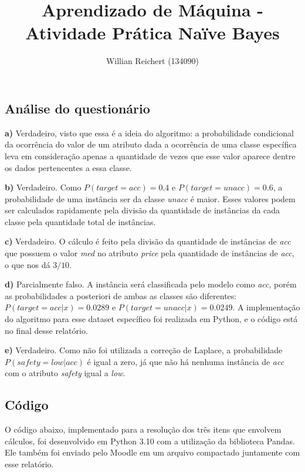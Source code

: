 \documentclass{article}
\title{Aprendizado de Máquina - Atividade Prática Naïve Bayes}
\author{Willian Reichert (134090)}
\date{}
\begin{document}
\maketitle

\subsection*{Análise do questionário}

\textbf{a)} Verdadeiro, visto que essa é a ideia do algoritmo: a probabilidade condicional da ocorrência do valor de um atributo dada a ocorrência de uma classe específica leva em consideração apenas a quantidade de vezes que esse valor aparece dentre os dados pertencentes a essa classe.

\medskip

\textbf{b)} Verdadeiro. Como \(P(target = acc) = 0.4\) e \(P(target = unacc) = 0.6\), a probabilidade de uma instância ser da classe \emph{unacc} é maior. Esses valores podem ser calculados rapidamente pela divisão da quantidade de instâncias da cada classe pela quantidade total de instâncias.

\medskip

\textbf{c)} Verdadeiro. O cálculo é feito pela divisão da quantidade de instâncias de \emph{acc} que possuem o valor \emph{med} no atributo \emph{price} pela quantidade de instâncias de \emph{acc}, o que nos dá \(3/10\).

\medskip

\textbf{d)} Parcialmente falso. A instância será classificada pelo modelo como \emph{acc}, porém as probabilidades a posteriori de ambas as classes são diferentes: \(P(target = acc | x) = 0.0289\) e \(P(target = unacc | x) = 0.0249\). A implementação do algoritmo para esse dataset específico foi realizada em Python, e o código está no final desse relatório.

\medskip

\textbf{e)} Verdadeiro. Como não foi utilizada a correção de Laplace, a probabilidade \(P(safety = low | acc)\) é igual a zero, já que não há nenhuma instância de \emph{acc} com o atributo \emph{safety} igual a \emph{low}.

\subsection*{Código}

O código abaixo, implementado para a resolução dos três itens que envolvem cálculos, foi desenvolvido em Python 3.10 com a utilização da biblioteca Pandas. Ele também foi enviado pelo Moodle em um arquivo compactado juntamente com esse relatório.


\end{document}
